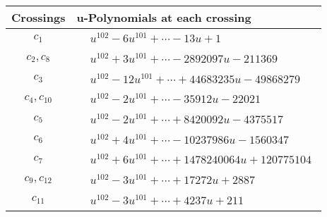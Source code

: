 \documentclass[1p]{elsarticle_modified}
\theoremstyle{definition}
\begin{document}
\begin{tabular}{m{50pt}|m{274pt}}
Crossings & \hspace{64pt}u-Polynomials at each crossing \\
\hline $$\begin{aligned}c_{1}\end{aligned}$$&$\begin{aligned}
&u^{102}-6 u^{101}+\cdots-13 u+1
\end{aligned}$\\
\hline $$\begin{aligned}c_{2},c_{8}\end{aligned}$$&$\begin{aligned}
&u^{102}+3 u^{101}+\cdots-2892097 u-211369
\end{aligned}$\\
\hline $$\begin{aligned}c_{3}\end{aligned}$$&$\begin{aligned}
&u^{102}-12 u^{101}+\cdots+44683235 u-49868279
\end{aligned}$\\
\hline $$\begin{aligned}c_{4},c_{10}\end{aligned}$$&$\begin{aligned}
&u^{102}-2 u^{101}+\cdots-35912 u-22021
\end{aligned}$\\
\hline $$\begin{aligned}c_{5}\end{aligned}$$&$\begin{aligned}
&u^{102}-2 u^{101}+\cdots+8420092 u-4375517
\end{aligned}$\\
\hline $$\begin{aligned}c_{6}\end{aligned}$$&$\begin{aligned}
&u^{102}+4 u^{101}+\cdots-10237986 u-1560347
\end{aligned}$\\
\hline $$\begin{aligned}c_{7}\end{aligned}$$&$\begin{aligned}
&u^{102}+6 u^{101}+\cdots+1478240064 u+120775104
\end{aligned}$\\
\hline $$\begin{aligned}c_{9},c_{12}\end{aligned}$$&$\begin{aligned}
&u^{102}-3 u^{101}+\cdots+17272 u+2887
\end{aligned}$\\
\hline $$\begin{aligned}c_{11}\end{aligned}$$&$\begin{aligned}
&u^{102}-3 u^{101}+\cdots+4237 u+211
\end{aligned}$\\
\hline
\end{tabular}\\~\\
\end{document}
